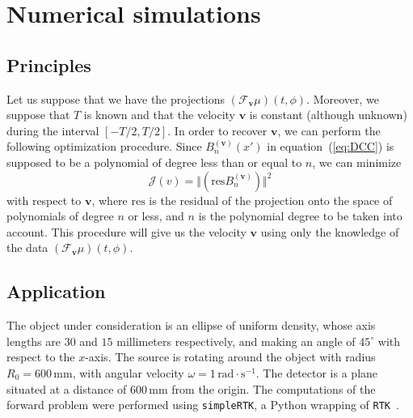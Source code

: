 \documentclass[letterpaper,twocolumn]{IEEEtran}
\newcommand{\bv}{\mathbf{v}}
\newcommand{\Tbv}{\mathcal{F}_{\mathbf{v}}}
\newcommand{\Bnv}{B_n^{(\bv)}}
\begin{document}
\section{Numerical simulations}

\subsection{Principles}
\label{sub:principles}
Let us suppose that we have the projections $\left( \Tbv \mu \right)(t,\phi)$. Moreover, we suppose that $T$ is known and that the velocity $\bv$ is constant (although unknown) during the interval $[-T/2, T/2]$. In order to recover $\bv$, we can perform the following optimization procedure. Since $\Bnv(x')$ in equation~(\ref{eq:DCC}) is supposed to be a polynomial of degree less than or equal to $n$, we can minimize
\begin{equation}
	\mathcal{J}(v) = \Vert \left( \textrm{res} \Bnv \right) \Vert^2
\label{eq:Jv}
\end{equation}
with respect to $\bv$, where $\textrm{res}$ is the residual of the projection onto the space of polynomials of degree $n$ or less, and $n$ is the polynomial degree to be taken into account. This procedure will give us the velocity $\bv$ using only the knowledge of the data $\left( \Tbv \mu \right)(t,\phi)$.

\subsection{Application}
\label{sub:application}

The object under consideration is an ellipse of uniform density, whose axis lengths are $30$ and $15$ millimeters respectively, and making an angle of $45^{\circ}$ with respect to the $x$-axis. The source is rotating around the object with radius $R_0 = 600 \, \textrm{mm}$, with angular velocity $\omega = 1 \, \textrm{rad} \cdot \textrm{s}^{-1}$. The detector is a plane situated at a distance of $600 \, \textrm{mm}$ from the origin. The computations of the forward problem were performed using \verb+simpleRTK+, a Python wrapping of \verb+RTK+~\cite{RTK}.
\end{document}
